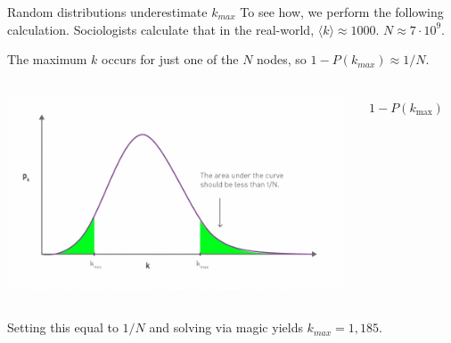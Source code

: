 \documentclass[notes]{beamer}
\begin{document}
\begin{frame}{Random distributions underestimate $k_{max}$}
  To see how, we perform the following calculation. Sociologists calculate
  that in the real-world, $\langle k \rangle \approx 1000$. $N \approx 7 \cdot 10^9$.

  The maximum $k$ occurs for
  just one of the $N$ nodes, so $1 - P(k_{max}) \approx 1/N$. \\[.25em]

  \begin{columns}
    \begin{column}{.48\textwidth}
      \includegraphics[width=\textwidth]{Figures/maxDegreeCalc.jpg}
    \end{column}
    \begin{column}{.48\textwidth}
      \begin{align*}
        1 - P(k_{\max}) & = 1 - e^{-\langle k \rangle} \sum_{k=0}^{k_{\max}} 
                                                     \frac{\langle k \rangle^k}{k!}  \\
                        & = e^{-\langle k \rangle} \sum_{k=k_{\max}+1}^{\infty} 
                                                     \frac{\langle k \rangle^k}{k!}  \\
                        & \approx e^{-\langle k \rangle} \frac{\langle k \rangle^{k_{\max}+1}}{(k_{\max} + 1)!}
      \end{align*}
    \end{column}
  \end{columns}
  Setting this equal to $1/N$ and solving via magic yields $k_{max} = 1,185$.
\end{frame}
\end{document}
